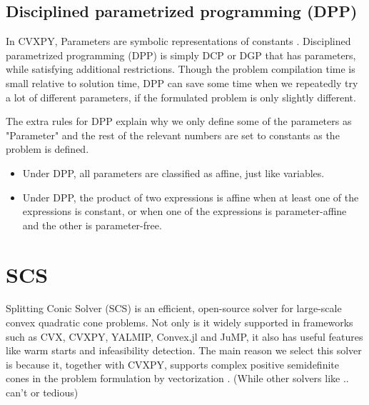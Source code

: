 \subsection{Disciplined parametrized programming (DPP)}
In CVXPY, Parameters are symbolic representations of constants \cite{RN480}. Disciplined parametrized
programming (DPP) is simply DCP or DGP that has parameters, while satisfying additional restrictions.
Though the problem compilation time is small relative to solution time, DPP can save some time when we
repeatedly try a lot of different parameters, if the formulated problem is only slightly different.

The extra rules for DPP explain why we only define some of the parameters as "Parameter" and the rest
of the relevant numbers are set to constants as the problem is defined.
\begin{itemize}
    \item Under DPP, all parameters are classified as affine, just like variables.
    \item Under DPP, the product of two expressions is affine when at least one of
          the expressions is constant, or when one of the expressions is parameter-affine and the other is parameter-free.
\end{itemize}


\section{SCS}
Splitting Conic Solver (SCS) \cite{scs} is an efficient, open-source solver for large-scale convex quadratic cone problems.
Not only is it widely supported in frameworks such as CVX, CVXPY, YALMIP, Convex.jl and JuMP, it also has useful features like warm starts
and infeasibility detection.
The main reason we select this solver is because it, together with CVXPY, supports complex positive
semidefinite cones in the problem formulation by vectorization \cite{RN482}.
(While other solvers like .. can't or tedious)

